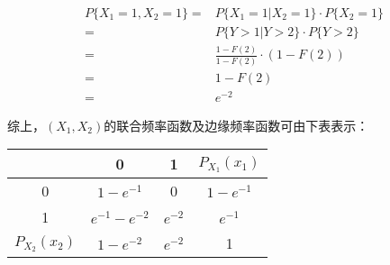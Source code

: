 \documentclass[a4paper,12pt]{ctexart}
\begin{document}
\begin{align*}
	P\{X_1 = 1, X_2 = 1\} =& P\{X_1 = 1 | X_2 = 1\} \cdot P\{X_2 = 1\} \\
	=& P\{Y > 1 | Y > 2\} \cdot P\{Y > 2\} \\
	=& \frac{1 - F(2)}{1 - F(2)} \cdot (1 - F(2)) \\
	=& 1 - F(2) \\
	=& e^{-2}
\end{align*}

\newpage
综上，$(X_1, X_2)$的联合频率函数及边缘频率函数可由下表表示：
\begin{center}
	\begin{tabular}{c|cc|c}
		\diagbox{$X_1$}{$X_2$} & 0 & 1 & $P_{X_1}(x_1)$ \\ \hline
		0 & $1 - e^{-1}$ & 0 & $1 - e^{-1}$ \\
		1 & $e^{-1} - e^{-2}$ & $e^{-2}$ & $e^{-1}$ \\ \hline
		$P_{X_2}(x_2)$ & $1 - e^{-2}$ & $e^{-2}$ & 1
	\end{tabular}
\end{center}
\end{document}
